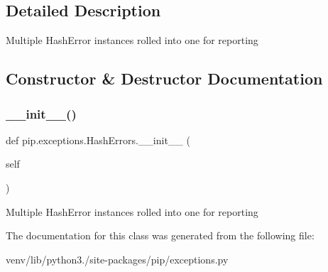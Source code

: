 \subsection{Detailed Description}
\begin{DoxyVerb}Multiple HashError instances rolled into one for reporting\end{DoxyVerb}
 

\subsection{Constructor \& Destructor Documentation}
\mbox{\label{classpip_1_1exceptions_1_1_hash_errors_a447c7a4e6193a67570fdf0a2ea289659}} 
\subsubsection{\texorpdfstring{\+\_\+\+\_\+init\+\_\+\+\_\+()}{\_\_init\_\_()}}
{\footnotesize\ttfamily def pip.\+exceptions.\+Hash\+Errors.\+\_\+\+\_\+init\+\_\+\+\_\+ (\begin{DoxyParamCaption}\item[{}]{self }\end{DoxyParamCaption})}

\begin{DoxyVerb}Multiple HashError instances rolled into one for reporting\end{DoxyVerb}
 

The documentation for this class was generated from the following file\+:\begin{DoxyCompactItemize}
\item 
venv/lib/python3./site-\/packages/pip/exceptions.\+py\end{DoxyCompactItemize}
